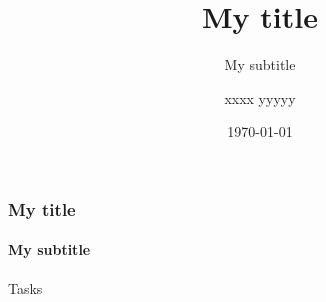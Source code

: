 \documentclass[utf8]{beamer}
\title{My title}
\subtitle{My subtitle}
\date{\today}
\author[xxxx]{xxxx yyyyy}
\institute[CEA]{CEA / XXXXX / XXXX}
\begin{document}
\begin{frame}
    \titlepage
\end{frame}

\begin{frame}
    \frametitle{My title}
    \framesubtitle{My subtitle}
    \begin{block}{Tasks}
    \end{block}
    
\end{frame}
\end{document}
